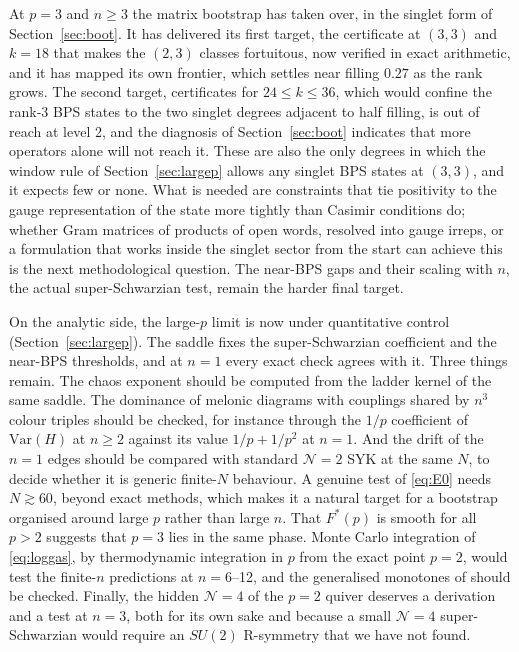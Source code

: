\documentclass[10pt]{article}
\begin{document}
At $p=3$ and $n\ge3$ the matrix bootstrap \cite{HHK,LZ,LM} has taken over, in the singlet form of
Section~\ref{sec:boot}. It has delivered its first target, the certificate at $(3,3)$ and $k=18$ that makes the
$(2,3)$ classes fortuitous, now verified in exact arithmetic, and it has mapped its own frontier, which settles near
filling $0.27$ as the rank grows. The second target, certificates for $24\le k\le36$, which would confine the rank-3 BPS
states to the two singlet degrees adjacent to half filling, is out of reach at level 2, and the diagnosis of
Section~\ref{sec:boot} indicates that more operators alone will not reach it. These are also the only degrees in
which the window rule of Section~\ref{sec:largep} allows any singlet BPS states at $(3,3)$, and it expects few or
none. What is needed are constraints that tie
positivity to the gauge representation of the state more tightly than Casimir conditions do; whether Gram matrices of
products of open words, resolved into gauge irreps, or a formulation that works inside the singlet sector from the
start can achieve this is the next methodological question. The near-BPS gaps and their scaling with $n$, the actual
super-Schwarzian test, remain the harder final target.

On the analytic side, the large-$p$ limit is now under quantitative control (Section~\ref{sec:largep}). The
saddle fixes the super-Schwarzian coefficient and the near-BPS thresholds, and at $n=1$ every exact check agrees
with it. Three things remain. The chaos exponent should be computed from the ladder kernel of the same saddle. The
dominance of melonic diagrams with couplings shared by $n^3$ colour triples should be checked, for instance through
the $1/p$ coefficient of $\mathrm{Var}(H)$ at $n\ge2$ against its value $1/p+1/p^2$ at $n=1$. And the drift of the
$n=1$ edges should be compared with standard $\mathcal N=2$ SYK at the same $N$, to decide whether it is generic
finite-$N$ behaviour. A genuine test of \eqref{eq:E0} needs $N\gtrsim60$, beyond exact methods, which makes it a
natural target for a bootstrap organised around large $p$ rather than large $n$. That $F^*(p)$ is smooth for all
$p>2$ suggests that $p=3$ lies in the same phase. Monte Carlo integration of \eqref{eq:loggas}, by thermodynamic
integration in $p$ from the exact point $p=2$, would test the finite-$n$ predictions at $n=6$--12, and the generalised
monotones of \cite{CCK} should be checked. Finally, the hidden $\mathcal N=4$ of the $p=2$ quiver deserves a
derivation and a test at $n=3$, both for its own sake and because a small $\mathcal N=4$ super-Schwarzian would require
an $SU(2)$ R-symmetry that we have not found.
\end{document}
